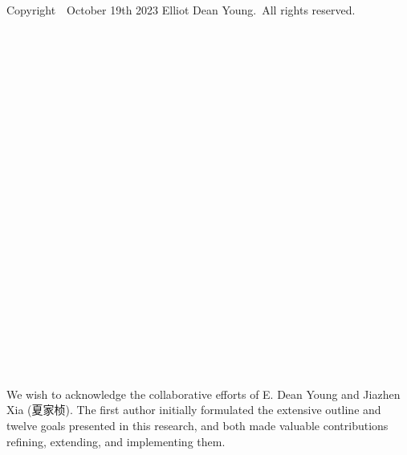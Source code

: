 \documentclass{book}
\theoremstyle{definition}
\begin{document}
\newpage


\begin{center}

\pagecolor{white}
\color{black}




\end{center}

\thispagestyle{empty}




\newpage
\pagecolor{white}
\color{black}
\ \\
\ \\
\thispagestyle{empty}
\begin{center}
Copyright\ \textcopyright \ October 19th 2023 Elliot Dean Young.\ All rights reserved.\\
\end{center}
\large %
\newpage 
\ \\
\ \\
\ \\
\ \\
\ \\
\ \\
\ \\
\ \\
\ \\
\ \\
\ \\
\thispagestyle{empty}
 
\newpage



\newpage

\ \\
\ \\
\ \\
\ \\
\ \\
\ \\
\ \\
\ \\
\ \\
\ \\
\ \\

We wish to acknowledge the collaborative efforts of E. Dean Young and Jiazhen Xia (夏家桢). The first author initially formulated the extensive outline and twelve goals presented in this research, and both made valuable contributions refining, extending, and implementing them.\\

\end{document}
